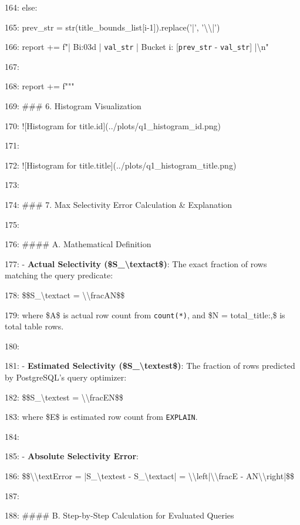 \documentclass[11pt,a4paper]{article}
\begin{document}
164:         else:

165:             prev\_str = str(title\_bounds\_list[i-1]).replace('|', '\textbackslash{}\textbackslash{}|')

166:             report += f"| B{i:03d} | \texttt{{val\_str}} | Bucket {i}: [\texttt{{prev\_str}} - \texttt{{val\_str}}] |\textbackslash{}n"

167:

168:     report += f"""

169: \#\#\# 6. Histogram Visualization

170: ![Histogram for title.id](../plots/q1\_histogram\_id.png)

171:

172: ![Histogram for title.title](../plots/q1\_histogram\_title.png)

173:

174: \#\#\# 7. Max Selectivity Error Calculation \& Explanation

175:

176: \#\#\#\# A. Mathematical Definition

177: - \textbf{Actual Selectivity (\$S\_{\textbackslash{}text{act}}\$)}: The exact fraction of rows matching the query predicate:

178:   \$\$S\_{\textbackslash{}text{act}} = \textbackslash{}\textbackslash{}frac{{A}}{{N}}\$\$

179:   where \$A\$ is actual row count from \texttt{count(*)}, and \$N = {total\_title:,}\$ is total table rows.

180:

181: - \textbf{Estimated Selectivity (\$S\_{\textbackslash{}text{est}}\$)}: The fraction of rows predicted by PostgreSQL's query optimizer:

182:   \$\$S\_{\textbackslash{}text{est}} = \textbackslash{}\textbackslash{}frac{{E}}{{N}}\$\$

183:   where \$E\$ is estimated row count from \texttt{EXPLAIN}.

184:

185: - \textbf{Absolute Selectivity Error}:

186:   \$\$\textbackslash{}\textbackslash{}text{{Error}} = |S\_{\textbackslash{}text{est}} - S\_{\textbackslash{}text{act}}| = \textbackslash{}\textbackslash{}left|\textbackslash{}\textbackslash{}frac{{E - A}}{{N}}\textbackslash{}\textbackslash{}right|\$\$

187:

188: \#\#\#\# B. Step-by-Step Calculation for Evaluated Queries
\end{document}

